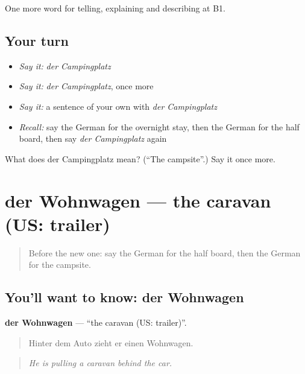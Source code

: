 \begin{grammarlens}[title={What you've built}]
One more word for telling, explaining and describing at B1.
\end{grammarlens}

\subsection*{Your turn}
\begin{itemize}
\raggedright
  \item \emph{Say it:} \emph{der Campingplatz}
  \item \emph{Say it:} \emph{der Campingplatz}, once more
  \item \emph{Say it:} a sentence of your own with \emph{der Campingplatz}
  \item \emph{Recall:} say the German for the overnight stay, then the German for the half board, then say \emph{der Campingplatz} again
\end{itemize}

\begin{tcolorbox}[breakable,colback=teal!4,colframe=teal!35!black,title={Before you move on}]
What does der Campingplatz mean? (\textquotedblleft{}The campsite\textquotedblright{}.) Say it once more.
\end{tcolorbox}
\section[der Wohnwagen]{der Wohnwagen — the caravan (US: trailer)}

\label{lesson:GE-C425-wohnwagen}



\begin{quote}
Before the new one: say the German for the half board, then the German for the campsite.
\end{quote}

\subsection*{You'll want to know: der Wohnwagen}
\textbf{der Wohnwagen} — \textquotedblleft{}the caravan (US: trailer)\textquotedblright{}.

\begin{quote}
Hinter dem Auto zieht er einen Wohnwagen.
\end{quote}

\begin{quote}
\emph{He is pulling a caravan behind the car.}
\end{quote}

